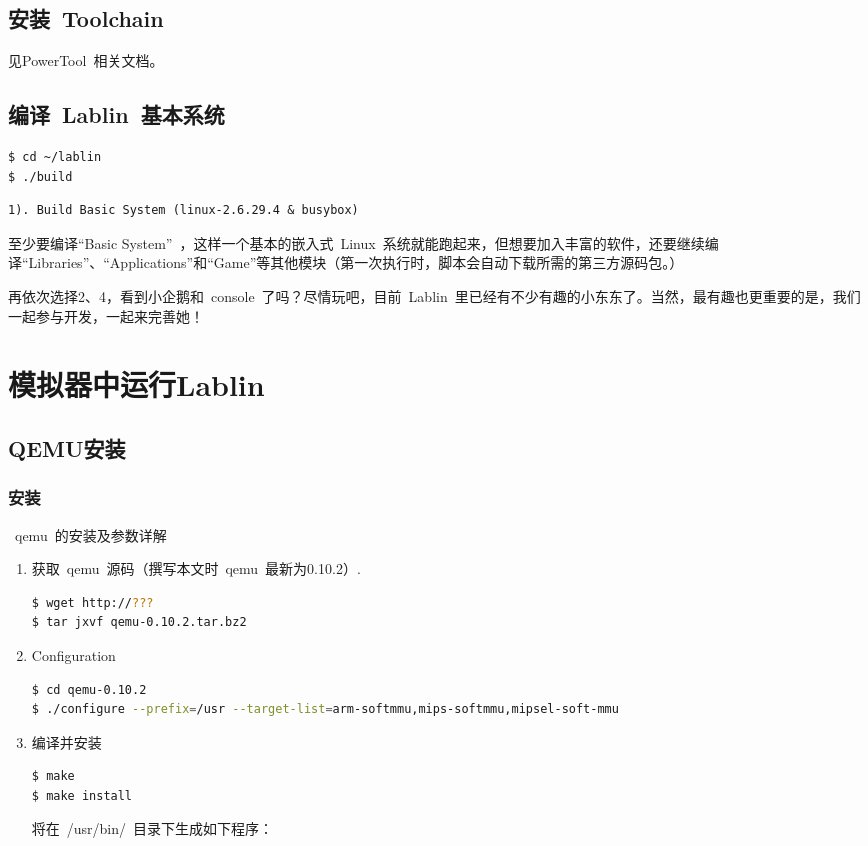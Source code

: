 \documentclass[a4paper,11pt]{article}
\begin{document}
\begin{CJK*}{UTF8}{gbsn}
\subsection{安装~Toolchain~}
见PowerTool~相关文档。

\subsection{编译~Lablin~基本系统}
\begin{lstlisting}[language=sh,numbers=none]
$ cd ~/lablin
$ ./build
\end{lstlisting}
\begin{verbatim}
1). Build Basic System (linux-2.6.29.4 & busybox)
\end{verbatim}

至少要编译``Basic System''~，这样一个基本的嵌入式~Linux~系统就能跑起来，但想要加入丰富的软件，还要继续编译``Libraries''、``Applications''和``Game''等其他模块（第一次执行时，脚本会自动下载所需的第三方源码包。）

再依次选择2、4，看到小企鹅和~console~了吗？尽情玩吧，目前~Lablin~里已经有不少有趣的小东东了。当然，最有趣也更重要的是，我们一起参与开发，一起来完善她！

\section{模拟器中运行Lablin}
\subsection{QEMU安装}

\subsubsection{安装}
\noindent
~qemu~的安装及参数详解
\begin{enumerate}
\item 获取~qemu~源码（撰写本文时~qemu~最新为0.10.2）.
\begin{lstlisting}[language=sh, numbers=none]
$ wget http://???
$ tar jxvf qemu-0.10.2.tar.bz2
\end{lstlisting}
\item Configuration
\begin{lstlisting}[language=sh, numbers=none]
$ cd qemu-0.10.2
$ ./configure --prefix=/usr --target-list=arm-softmmu,mips-softmmu,mipsel-soft-mmu
\end{lstlisting}
\item 编译并安装
\begin{lstlisting}[language=sh, numbers=none]
$ make
$ make install 
\end{lstlisting}
将在~/usr/bin/~目录下生成如下程序：
\end{enumerate}


\end{CJK*}
\end{document}
